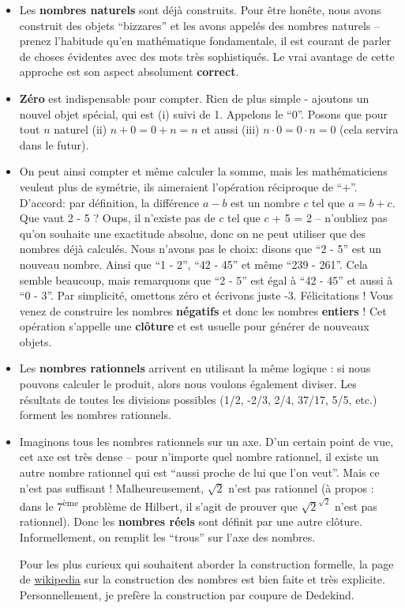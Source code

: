 \begin{itemize}
	\item Les \textbf{nombres naturels} sont déjà construits. Pour être honête, nous avons construit des objets ``bizzares'' et les avons appelés des nombres naturels -- prenez l'habitude qu'en mathématique fondamentale, il est courant de parler de choses évidentes avec des mots très sophistiqués. Le vrai avantage de cette approche est son aspect absolument \textbf{correct}.
	\item \textbf{Zéro} est indispensable pour compter. Rien de plus simple - ajoutons un nouvel objet spécial, qui est (i) suivi de 1. Appelons le ``0''. Posons que pour tout $n$ naturel (ii) $n + 0 = 0 + n = n$ et aussi (iii) $n \cdot 0 = 0 \cdot n = 0$ (cela servira dans le futur).
	\item On peut ainsi compter et même calculer la somme, mais les mathématiciens veulent plus de symétrie, ils aimeraient l'opération réciproque de ``+''. D'accord: par définition, la différence $a - b$ est un nombre $c$ tel que $a = b + c$. Que vaut 2 - 5 ? Oups, il n'existe pas de $c$ tel que $c$ + 5 = 2 -- n'oubliez pas qu'on souhaite une exactitude absolue, donc on ne peut utiliser que des nombres déjà calculés. Nous n'avons pas le choix: disons que ``2 - 5'' est un nouveau nombre. Ainsi que ``1 - 2'', ``42 - 45'' et même ``239 - 261''. Cela semble beaucoup, mais remarquons que ``2 - 5'' est égal à ``42 - 45'' et aussi à ``0 - 3''. Par simplicité, omettons zéro et écrivons juste -3. Félicitations ! Vous venez de construire les nombres \textbf{négatifs} et donc les nombres \textbf{entiers} !
	Cet opération s'appelle une \textbf{clôture} et est usuelle pour générer de nouveaux objets.
	\item Les \textbf{nombres rationnels} arrivent en utilisant la même logique : si nous pouvons calculer le produit, alors nous voulons également diviser. Les résultats de toutes les divisions possibles (1/2, -2/3, 2/4, 37/17, 5/5, etc.) forment les nombres rationnels.
	\item Imaginons tous les nombres rationnels sur un axe. D'un certain point de vue, cet axe est très dense -- pour n'importe quel nombre rationnel, il existe un autre nombre rationnel qui est ``aussi proche de lui que l'on veut''. Mais ce n'est pas suffisant ! Malheureusement, $\sqrt{2}$ n'est pas rationnel (à propos : dans le 7\textsuperscript{ème} problème de Hilbert, il s'agit de prouver que $\sqrt2^{\sqrt2}$ n'est pas rationnel).
	Donc les \textbf{nombres réels} sont définit par une autre clôture. Informellement, on remplit les ``trous'' sur l'axe des nombres.

Pour les plus curieux qui souhaitent aborder la construction formelle, la page de
	\href{
		/wiki/Construction_des_nombres_r%
		}{wikipedia} sur la construction des nombres est bien faite et très explicite.
	Personnellement, je prefère la construction par coupure de Dedekind.
\end{itemize}

